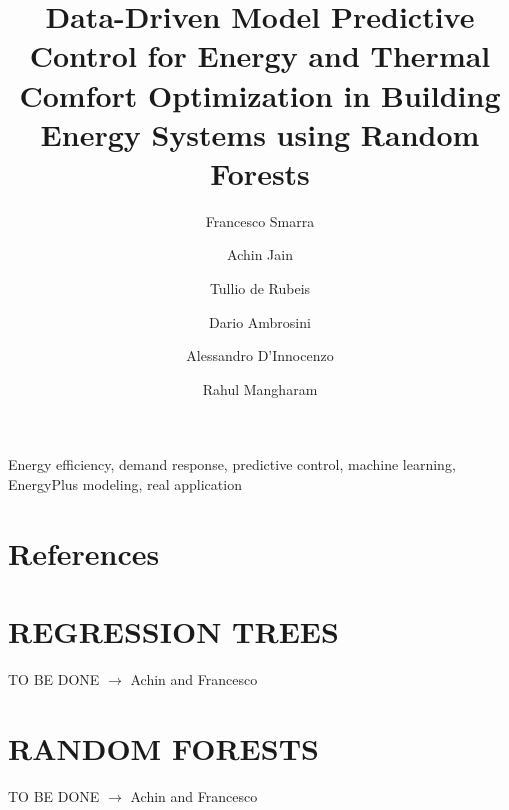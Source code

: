 \documentclass[review]{elsarticle}
\begin{document}
\begin{frontmatter}

\title{\textcolor[rgb]{0,0,1}{Data-Driven Model Predictive Control for Energy and Thermal Comfort Optimization in Building Energy Systems using Random Forests}}

\author[FSaddress,EC]{Francesco Smarra}

\author[AJaddress,EC]{Achin Jain}
\author[TDRaddress,EC]{Tullio de Rubeis}
\author[TDRaddress]{Dario Ambrosini}
\author[FSaddress]{Alessandro D'Innocenzo}
\author[AJaddress]{Rahul Mangharam}


\address[FSaddress]{Department of Information Engineering, Computer Science and Mathematics, Universit\`{a} degli Studi dell'Aquila, L'Aquila, Italy}
\address[AJaddress]{Department of Electrical and Systems Engineering, University of Pennsylvania, Philadelphia, USA}
\address[TDRaddress]{"G. Parolini Lab" - Department of Industrial and Information Engineering and Economics, Universit\`{a} degli Studi dell'Aquila, L'Aquila, Italy}


\begin{abstract}
%
\end{abstract}

\begin{keyword}
Energy efficiency, demand response, predictive control, machine learning, EnergyPlus modeling, real application
\end{keyword}

\end{frontmatter}
















\section*{References}



\appendix
\section{REGRESSION TREES}\label{AppendixRT}
TO BE DONE $\rightarrow$ \textcolor[rgb]{0,0,1}{Achin and Francesco}
\section{RANDOM FORESTS}\label{AppendixRF}
TO BE DONE $\rightarrow$ \textcolor[rgb]{0,0,1}{Achin and Francesco}
\end{document}
